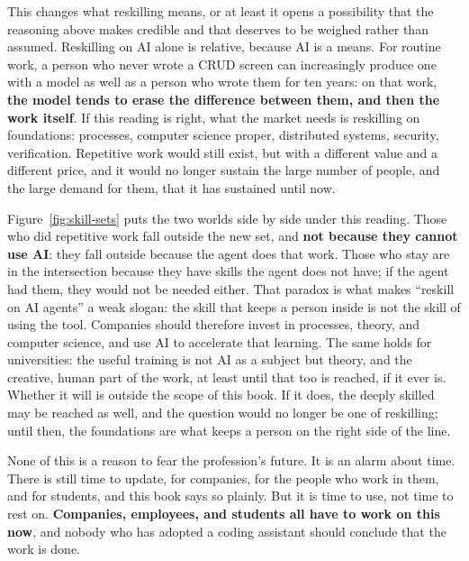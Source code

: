 \documentclass[10pt,oneside,openany]{book}
\begin{document}
This changes what reskilling means, or at least it opens a possibility that the reasoning above makes credible and that deserves to be weighed rather than assumed. Reskilling on AI alone is relative, because AI is a means. For routine work, a person who never wrote a CRUD screen can increasingly produce one with a model as well as a person who wrote them for ten years: on that work, \textbf{the model tends to erase the difference between them, and then the work itself}. If this reading is right, what the market needs is reskilling on foundations: processes, computer science proper, distributed systems, security, verification. Repetitive work would still exist, but with a different value and a different price, and it would no longer sustain the large number of people, and the large demand for them, that it has sustained until now.

Figure~\ref{fig:skill-sets} puts the two worlds side by side under this reading. Those who did repetitive work fall outside the new set, and \textbf{not because they cannot use AI}: they fall outside because the agent does that work. Those who stay are in the intersection because they have skills the agent does not have; if the agent had them, they would not be needed either. That paradox is what makes ``reskill on AI agents'' a weak slogan: the skill that keeps a person inside is not the skill of using the tool. Companies should therefore invest in processes, theory, and computer science, and use AI to accelerate that learning. The same holds for universities: the useful training is not AI as a subject but theory, and the creative, human part of the work, at least until that too is reached, if it ever is. Whether it will is outside the scope of this book. If it does, the deeply skilled may be reached as well, and the question would no longer be one of reskilling; until then, the foundations are what keeps a person on the right side of the line.

None of this is a reason to fear the profession's future. It is an alarm about time. There is still time to update, for companies, for the people who work in them, and for students, and this book says so plainly. But it is time to use, not time to rest on. \textbf{Companies, employees, and students all have to work on this now}, and nobody who has adopted a coding assistant should conclude that the work is done.
\end{document}
